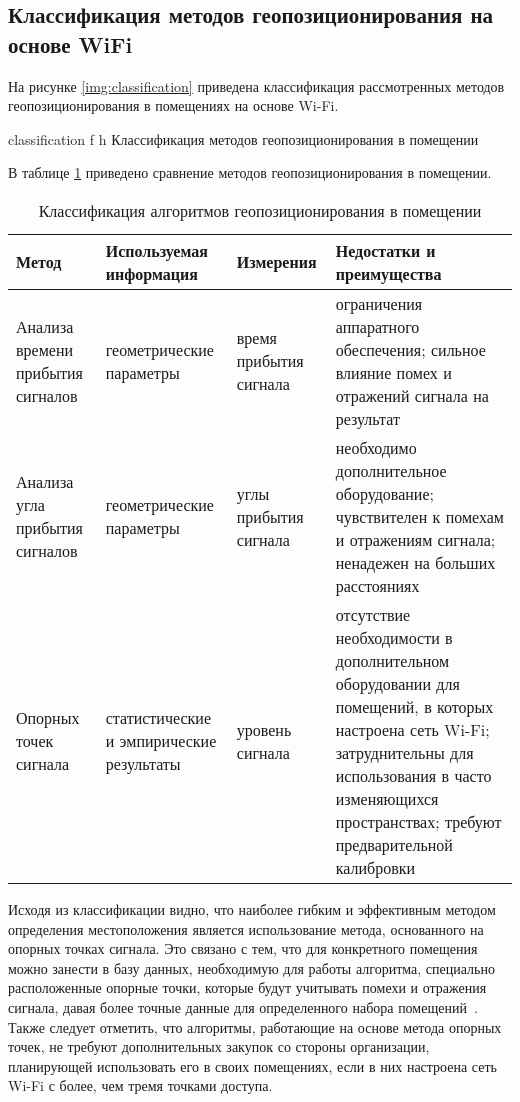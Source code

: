 
\clearpage

\subsection{Классификация методов геопозиционирования на основе WiFi}

На рисунке \ref{img:classification} приведена классификация рассмотренных методов геопозиционирования в помещениях на основе Wi-Fi.

    {classification}
    {f}
    {h}
    {\linewidth}
    {Классификация методов геопозиционирования в помещении}

\clearpage

В таблице \ref{table:classification} приведено сравнение методов геопозиционирования в помещении.

\begin{table}[ht]
    \caption{Классификация алгоритмов геопозиционирования в помещении}
    \begin{tabular}{|m{3cm}|m{3.5cm}|m{3cm}|m{5.5cm}|}
        \hline
        Метод & Используемая информация & Измерения & Недостатки и преимущества \\
        \hline
        \hline
        Анализа времени прибытия сигналов & геометрические параметры & время прибытия сигнала & ограничения аппаратного обеспечения; сильное влияние помех и отражений сигнала на результат \\
        \hline
        Анализа угла прибытия сигналов & геометрические параметры & углы прибытия сигнала & необходимо дополнительное оборудование; чувствителен к помехам и отражениям сигнала; ненадежен на больших расстояниях \\
        \hline
        Опорных точек сигнала & статистические и эмпирические результаты & уровень сигнала & отсутствие необходимости в дополнительном оборудовании для помещений, в которых настроена сеть Wi-Fi; затруднительны для использования в часто изменяющихся пространствах; требуют предварительной калибровки \\
        \hline
    \end{tabular}
    \label{table:classification}
\end{table}

Исходя из классификации видно, что наиболее гибким и эффективным методом определения местоположения является использование метода, основанного на опорных точках сигнала. Это связано с тем, что для конкретного помещения можно занести в базу данных, необходимую для работы алгоритма, специально расположенные опорные точки, которые будут учитывать помехи и отражения сигнала, давая более точные данные для определенного набора помещений~\cite{bag}. Также следует отметить, что алгоритмы, работающие на основе метода опорных точек, не требуют дополнительных закупок со стороны организации, планирующей использовать его в своих помещениях, если в них настроена сеть Wi-Fi с более, чем тремя точками доступа.

